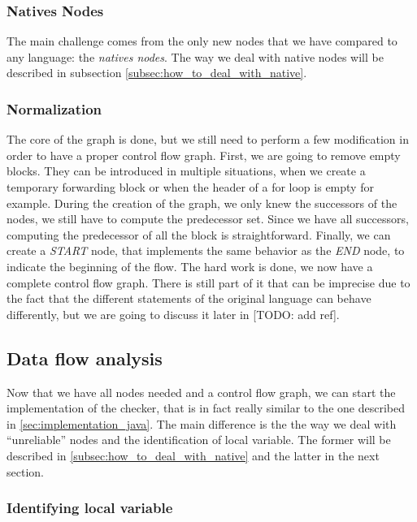 \subsubsection{Natives Nodes}
\label{subsubsec:native_nodes_cfg}

The main challenge comes from the only new nodes that we have compared to any language: the \emph{natives nodes}. 
The way we deal with native nodes will be described in subsection \ref{subsec:how_to_deal_with_native}.

\subsubsection{Normalization}
\label{subsubsec:normalization_cfg}
The core of the graph is done, but we still need to perform a few modification in order to have a proper control flow graph. 
First, we are going to remove empty blocks. 
They can be introduced in multiple situations, when we create a temporary forwarding block or when the header of a for loop is empty for example.
During the creation of the graph, we only knew the successors of the nodes, we still have to compute the predecessor set. 
Since we have all successors, computing the predecessor of all the block is straightforward. Finally, we can create a \emph{START} node, that implements the same behavior as the \emph{END} node, to indicate the beginning of the flow. \newline
The hard work is done, we now have a complete control flow graph. 
There is still part of it that can be imprecise due to the fact that the different statements of the original language can behave differently, but we are going to discuss it later in [TODO: add ref].

\subsection{Data flow analysis}
\label{subsec:data_flow_analysis}

Now that we have all nodes needed and a control flow graph, we can start the implementation of the checker, that is in fact really similar to the one described in \ref{sec:implementation_java}. 
The main difference is the the way we deal with “unreliable” nodes and the identification of local variable. 
The former will be described in \ref{subsec:how_to_deal_with_native} and the latter in the next section.

\subsubsection{Identifying local variable}
\label{subsubsec:identifying_local_variable}


